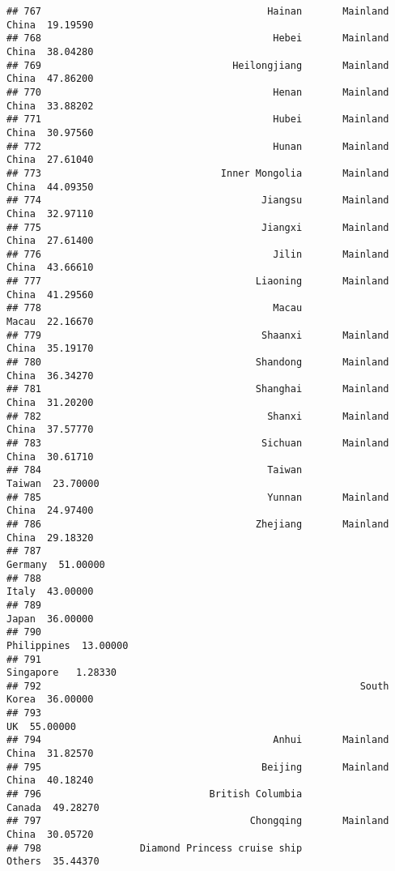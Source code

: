 \documentclass[
]{article}
\begin{document}
\begin{verbatim}
## 767                                       Hainan       Mainland China  19.19590
## 768                                        Hebei       Mainland China  38.04280
## 769                                 Heilongjiang       Mainland China  47.86200
## 770                                        Henan       Mainland China  33.88202
## 771                                        Hubei       Mainland China  30.97560
## 772                                        Hunan       Mainland China  27.61040
## 773                               Inner Mongolia       Mainland China  44.09350
## 774                                      Jiangsu       Mainland China  32.97110
## 775                                      Jiangxi       Mainland China  27.61400
## 776                                        Jilin       Mainland China  43.66610
## 777                                     Liaoning       Mainland China  41.29560
## 778                                        Macau                Macau  22.16670
## 779                                      Shaanxi       Mainland China  35.19170
## 780                                     Shandong       Mainland China  36.34270
## 781                                     Shanghai       Mainland China  31.20200
## 782                                       Shanxi       Mainland China  37.57770
## 783                                      Sichuan       Mainland China  30.61710
## 784                                       Taiwan               Taiwan  23.70000
## 785                                       Yunnan       Mainland China  24.97400
## 786                                     Zhejiang       Mainland China  29.18320
## 787                                                           Germany  51.00000
## 788                                                             Italy  43.00000
## 789                                                             Japan  36.00000
## 790                                                       Philippines  13.00000
## 791                                                         Singapore   1.28330
## 792                                                       South Korea  36.00000
## 793                                                                UK  55.00000
## 794                                        Anhui       Mainland China  31.82570
## 795                                      Beijing       Mainland China  40.18240
## 796                             British Columbia               Canada  49.28270
## 797                                    Chongqing       Mainland China  30.05720
## 798                 Diamond Princess cruise ship               Others  35.44370

\end{verbatim}
\end{document}
